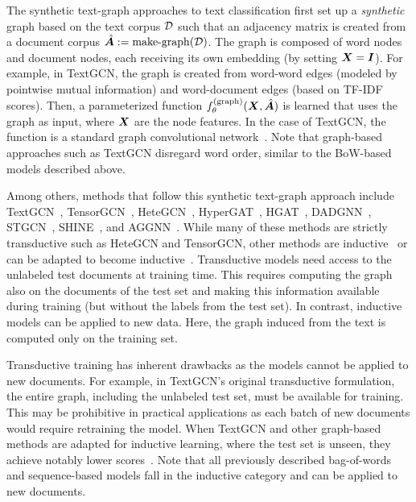 \documentclass[lettersize,journal]{IEEEtran}
\begin{document}
The synthetic text-graph approaches to text classification first set up a \emph{synthetic} graph based on the text corpus $\mathcal{D}$ such that an adjacency matrix is created from a document corpus $\hat{{\bm{A}}} := \operatorname{make-graph}(\mathcal{D})$.
The graph is composed of word nodes and document nodes, each receiving its own embedding (by setting ${\bm{X}} ={\bm{I}}$).
For example, in TextGCN, the graph is created from word-word edges (modeled by pointwise mutual information) and word-document edges (based on TF-IDF scores). 
Then, a parameterized function $f_\theta^{(\mathrm{graph})}({\bm{X}}, \hat{{\bm{A}}})$ is learned that uses the graph as input, where ${\bm{X}}$ are the node features. 
In the case of TextGCN, the function is a standard graph convolutional network~\cite{DBLP:conf/iclr/KipfW17}. 
Note that graph-based approaches such as TextGCN disregard word order, similar to the BoW-based models described above.

Among others, methods that follow this synthetic text-graph approach include 
TextGCN~\cite{DBLP:conf/aaai/YaoM019},
TensorGCN~\cite{DBLP:conf/aaai/LiuYZWL20},
Hete\-GCN~\cite{DBLP:conf/wsdm/RageshSIBL21},
HyperGAT~\cite{DBLP:conf/emnlp/DingWLLL20}, 
HGAT~\cite{DBLP:journals/tois/YangHSJLN21},
DADGNN~\cite{DBLP:conf/emnlp/LiuGG0F21}, 
STGCN~\cite{stgcn},
SHINE~\cite{DBLP:conf/emnlp/WangWYD21}, and
AGGNN~\cite{aggnn}.
While many of these methods are strictly transductive such as HeteGCN and TensorGCN, other methods are 
inductive~\cite{DBLP:conf/coling/HuangCC22,induct-gcn,texting_acl2020,DBLP:conf/emnlp/HuangMLZW19} or can be adapted to become inductive~\cite{DBLP:conf/wsdm/RageshSIBL21}.
Transductive models need access to the unlabeled test documents at training time. 
This requires computing the graph also on the documents of the test set and making this information available during training (but without the labels from the test set).
In contrast, inductive models can be applied to new data. 
Here, the graph induced from the text is computed only on the training set.

Transductive training has inherent drawbacks as the models cannot be applied to new documents.
For example, in TextGCN's original transductive formulation, the entire graph, including the unlabeled test set, must be available for training.
This may be prohibitive in practical applications as each batch of new documents would require retraining the model.
When TextGCN and other graph-based methods are adapted for inductive learning, where the test set is unseen, they achieve notably lower scores~\cite{DBLP:conf/wsdm/RageshSIBL21}. 
Note that all previously described bag-of-words and sequence-based models fall in the inductive category and can be applied to new documents.
\end{document}
